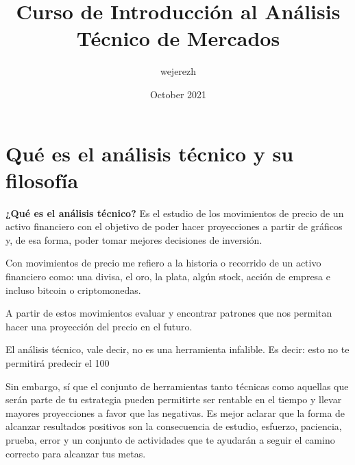 \documentclass{article}
\title{Curso de Introducción al Análisis Técnico de Mercados}
\author{wejerezh }
\date{October 2021}
\begin{document}



\newpage
{}
\tableofcontents
\newpage


\section{Qué es el análisis técnico y su filosofía}
    \textbf{¿Qué es el análisis técnico?}
Es el estudio de los movimientos de precio de un activo financiero con el objetivo de poder hacer proyecciones a partir de gráficos y, de esa forma, poder tomar mejores decisiones de inversión.

Con movimientos de precio me refiero a la historia o recorrido de un activo financiero como: una divisa, el oro, la plata, algún stock, acción de empresa e incluso bitcoin o criptomonedas.

A partir de estos movimientos evaluar y encontrar patrones que nos permitan hacer una proyección del precio en el futuro.

El análisis técnico, vale decir, no es una herramienta infalible. Es decir: esto no te permitirá predecir el 100%

Sin embargo, sí que el conjunto de herramientas tanto técnicas como aquellas que serán parte de tu estrategia pueden permitirte ser rentable en el tiempo y llevar mayores proyecciones a favor que las negativas. Es mejor aclarar que la forma de alcanzar resultados positivos son la consecuencia de estudio, esfuerzo, paciencia, prueba, error y un conjunto de actividades que te ayudarán a seguir el camino correcto para alcanzar tus metas.
\end{document}
